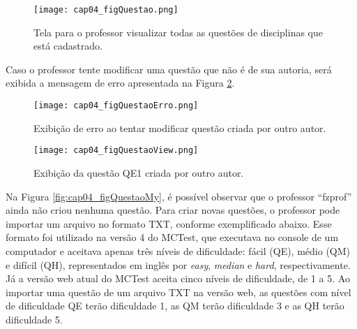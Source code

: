\begin{figure}[!ht]
  \centering
  \texttt{[image: cap04\_figQuestao.png]}
  \caption{Tela para o professor visualizar todas as questões de disciplinas que está cadastrado.}
  \label{fig:cap04_figQuestao}
\end{figure}

Caso o professor tente modificar uma questão que não é de sua autoria, será exibida a mensagem de erro apresentada na Figura \ref{fig:cap04_figQuestaoErro}.

\begin{figure}[!ht]
  \centering
  \texttt{[image: cap04\_figQuestaoErro.png]}
  \caption{Exibição de erro ao tentar modificar questão criada por outro autor.}
  \label{fig:cap04_figQuestaoErro}
\end{figure}


\begin{figure}[!ht]
  \centering
  \texttt{[image: cap04\_figQuestaoView.png]}
  \caption{Exibição da questão QE1 criada por outro autor.}
  \label{fig:cap04_figQuestaoView}
\end{figure}

Na Figura \ref{fig:cap04_figQuestaoMy}, é possível observar que o professor ``fzprof'' ainda não criou nenhuma questão. Para criar novas questões, o professor pode importar um arquivo no formato TXT, conforme exemplificado abaixo. Esse formato foi utilizado na versão 4 do MCTest, que executava no console de um computador e aceitava apenas três níveis de dificuldade: fácil (QE), médio (QM) e difícil (QH), representados em inglês por \textit{easy}, \textit{median} e \textit{hard}, respectivamente. Já a versão web atual do MCTest aceita cinco níveis de dificuldade, de 1 a 5. Ao importar uma questão de um arquivo TXT na versão web, as questões com nível de dificuldade QE terão dificuldade 1, as QM terão dificuldade 3 e as QH terão dificuldade 5.


